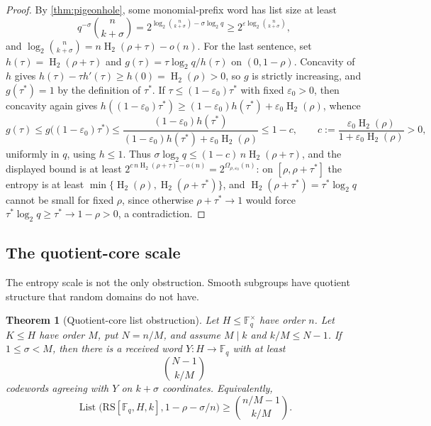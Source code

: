 \documentclass[11pt]{article}
\newtheorem{theorem}{Theorem}[section]
\theoremstyle{definition}
\newcommand{\F}{\mathbb F}
\newcommand{\eps}{\varepsilon}
\newcommand{\HH}{\operatorname{H}_2}
\newcommand{\RS}{\mathrm{RS}}
\newcommand{\Lst}{\operatorname{List}}
\newcommand{\taustar}{\tau^{*}}
\begin{document}
\begin{proof}
By \cref{thm:pigeonhole}, some monomial-prefix word has list size at least
\[
        q^{-\sigma}\binom n{k+\sigma}
        =2^{\log_2\binom n{k+\sigma}-\sigma\log_2q}
        \ge2^{\eps\log_2\binom n{k+\sigma}},
\]
and $\log_2\binom n{k+\sigma}=n\HH(\rho+\tau)-o(n)$.  For the last sentence, set $h(\tau)=\HH(\rho+\tau)$ and $g(\tau)=\tau\log_2q/h(\tau)$ on $(0,1-\rho)$.  Concavity of $h$ gives $h(\tau)-\tau h'(\tau)\ge h(0)=\HH(\rho)>0$, so $g$ is strictly increasing, and $g(\taustar)=1$ by the definition of $\taustar$.  If $\tau\le(1-\eps_0)\taustar$ with fixed $\eps_0>0$, then concavity again gives $h((1-\eps_0)\taustar)\ge(1-\eps_0)h(\taustar)+\eps_0\HH(\rho)$, whence
\[
        g(\tau)\le g\big((1-\eps_0)\taustar\big)
        \le\frac{(1-\eps_0)h(\taustar)}{(1-\eps_0)h(\taustar)+\eps_0\HH(\rho)}
        \le 1-c,
        \qquad
        c:=\frac{\eps_0\HH(\rho)}{1+\eps_0\HH(\rho)}>0,
\]
uniformly in $q$, using $h\le1$.  Thus $\sigma\log_2q\le(1-c)\,n\HH(\rho+\tau)$, and the displayed bound is at least $2^{c\,n\HH(\rho+\tau)-o(n)}=2^{\Omega_{\rho,\eps_0}(n)}$: on $[\rho,\rho+\taustar]$ the entropy is at least $\min\{\HH(\rho),\HH(\rho+\taustar)\}$, and $\HH(\rho+\taustar)=\taustar\log_2q$ cannot be small for fixed $\rho$, since otherwise $\rho+\taustar\to1$ would force $\taustar\log_2q\ge\taustar\to1-\rho>0$, a contradiction.
\end{proof}

\subsection{The quotient-core scale}\label{subsec:qcore}

The entropy scale is not the only obstruction.  Smooth subgroups have quotient structure that random domains do not have.

\begin{theorem}[Quotient-core list obstruction]\label{thm:qcore}
Let $H\le\F_q^\times$ have order $n$.  Let $K\le H$ have order $M$, put $N=n/M$, and assume $M\mid k$ and $k/M\le N-1$.  If $1\le\sigma<M$, then there is a received word $Y:H\to\F_q$ with at least
\[
        \binom{N-1}{k/M}
\]
codewords agreeing with $Y$ on $k+\sigma$ coordinates.  Equivalently,
\[
        \Lst\big(\RS[\F_q,H,k],1-\rho-\sigma/n\big)\ge \binom{n/M-1}{k/M}.
\]
\end{theorem}
\end{document}
